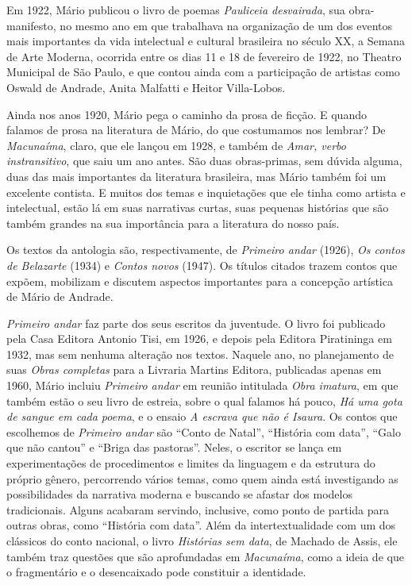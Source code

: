 \documentclass[12pt]{extarticle}
\begin{document}
{Em 1922, Mário publicou o livro de poemas \emph{Pauliceia desvairada},
sua obra-manifesto, no mesmo ano em que trabalhava na organização de um
dos eventos mais importantes da vida intelectual e cultural brasileira
no século XX, a Semana de Arte Moderna, ocorrida entre os dias 11 e 18
de fevereiro de 1922, no Theatro Municipal de São Paulo, e que contou
ainda com a participação de artistas como Oswald de Andrade, Anita
Malfatti e Heitor Villa-Lobos.

Ainda nos anos 1920, Mário pega o caminho da prosa de ficção. E quando
falamos de prosa na literatura de Mário, do que costumamos nos lembrar?
De \emph{Macunaíma}, claro, que ele lançou em 1928, e também de
\emph{Amar, verbo instransitivo}, que saiu um ano antes. São duas
obras-primas, sem dúvida alguma, duas das mais importantes da literatura
brasileira, mas Mário também foi um excelente contista. E muitos dos
temas e inquietações que ele tinha como artista e intelectual, estão lá
em suas narrativas curtas, suas pequenas histórias que são também
grandes na sua importância para a literatura do nosso país.

Os textos da antologia são, respectivamente, de \emph{Primeiro andar}
(1926), \emph{Os contos de Belazarte} (1934) e \emph{Contos novos}
(1947). Os títulos citados trazem contos que expõem, mobilizam e
discutem aspectos importantes para a concepção artística de Mário de
Andrade.

\emph{Primeiro andar} faz parte dos seus escritos da juventude. O livro
foi publicado pela Casa Editora Antonio Tisi, em 1926, e depois pela
Editora Piratininga em 1932, mas sem nenhuma alteração nos textos.
Naquele ano, no planejamento de suas \emph{Obras completas} para a
Livraria Martins Editora, publicadas apenas em 1960, Mário incluiu
\emph{Primeiro andar} em reunião intitulada \emph{Obra imatura}, em que
também estão o seu livro de estreia, sobre o qual falamos há pouco,
\emph{Há uma gota de sangue em cada poema}, e o ensaio \emph{A escrava
que não é Isaura}. Os contos que escolhemos de \emph{Primeiro andar} são
``Conto de Natal'', ``História com data'', ``Galo que não cantou'' e
``Briga das pastoras''. Neles, o escritor se lança em experimentações de
procedimentos e limites da linguagem e da estrutura do próprio gênero,
percorrendo vários temas, como quem ainda está investigando as
possibilidades da narrativa moderna e buscando se afastar dos modelos
tradicionais. Alguns acabaram servindo, inclusive, como ponto de partida
para outras obras, como ``História com data''. Além da intertextualidade
com um dos clássicos do conto nacional, o livro \emph{Histórias sem
data}, de Machado de Assis, ele também traz questões que são
aprofundadas em \emph{Macunaíma}, como a ideia de que o fragmentário e o
desencaixado pode constituir a identidade.

}
\end{document}
